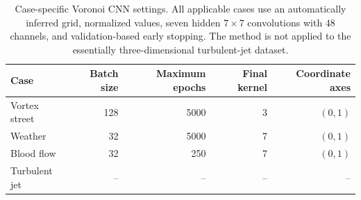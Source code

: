 \begin{table}[htbp]
  \centering
  \small
  \begin{tabular}{@{}lrrrr@{}}
    \toprule
    Case & Batch size & Maximum epochs & Final kernel & Coordinate axes \\
    \midrule
    Vortex street & 128 & 5000 & 3 & $(0,1)$ \\
    Weather & 32 & 5000 & 7 & $(0,1)$ \\
    Blood flow & 32 & 250 & 7 & $(0,1)$ \\
    Turbulent jet & -- & -- & -- & -- \\
    \bottomrule
  \end{tabular}
  \caption{Case-specific Voronoi CNN settings. All applicable cases use an automatically inferred grid, normalized values, seven hidden $7\times7$ convolutions with $48$ channels, and validation-based early stopping. The method is not applied to the essentially three-dimensional turbulent-jet dataset.}
  \label{tab:app-rformer-voronoi}
\end{table}
